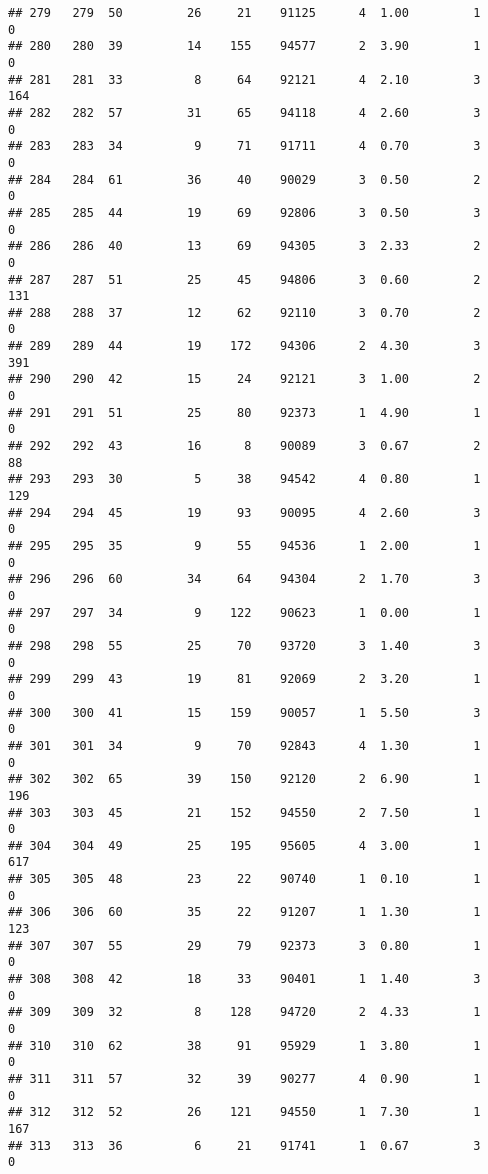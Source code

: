 \documentclass[
]{article}
\begin{document}
\begin{verbatim}
## 279   279  50         26     21    91125      4  1.00         1        0
## 280   280  39         14    155    94577      2  3.90         1        0
## 281   281  33          8     64    92121      4  2.10         3      164
## 282   282  57         31     65    94118      4  2.60         3        0
## 283   283  34          9     71    91711      4  0.70         3        0
## 284   284  61         36     40    90029      3  0.50         2        0
## 285   285  44         19     69    92806      3  0.50         3        0
## 286   286  40         13     69    94305      3  2.33         2        0
## 287   287  51         25     45    94806      3  0.60         2      131
## 288   288  37         12     62    92110      3  0.70         2        0
## 289   289  44         19    172    94306      2  4.30         3      391
## 290   290  42         15     24    92121      3  1.00         2        0
## 291   291  51         25     80    92373      1  4.90         1        0
## 292   292  43         16      8    90089      3  0.67         2       88
## 293   293  30          5     38    94542      4  0.80         1      129
## 294   294  45         19     93    90095      4  2.60         3        0
## 295   295  35          9     55    94536      1  2.00         1        0
## 296   296  60         34     64    94304      2  1.70         3        0
## 297   297  34          9    122    90623      1  0.00         1        0
## 298   298  55         25     70    93720      3  1.40         3        0
## 299   299  43         19     81    92069      2  3.20         1        0
## 300   300  41         15    159    90057      1  5.50         3        0
## 301   301  34          9     70    92843      4  1.30         1        0
## 302   302  65         39    150    92120      2  6.90         1      196
## 303   303  45         21    152    94550      2  7.50         1        0
## 304   304  49         25    195    95605      4  3.00         1      617
## 305   305  48         23     22    90740      1  0.10         1        0
## 306   306  60         35     22    91207      1  1.30         1      123
## 307   307  55         29     79    92373      3  0.80         1        0
## 308   308  42         18     33    90401      1  1.40         3        0
## 309   309  32          8    128    94720      2  4.33         1        0
## 310   310  62         38     91    95929      1  3.80         1        0
## 311   311  57         32     39    90277      4  0.90         1        0
## 312   312  52         26    121    94550      1  7.30         1      167
## 313   313  36          6     21    91741      1  0.67         3        0

\end{verbatim}
\end{document}
